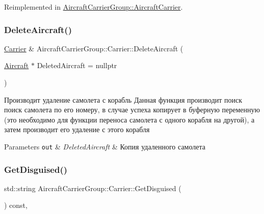 Reimplemented in \mbox{\hyperlink{class_aircraft_carrier_group_1_1_aircraft_carrier_ab2caba5f25f136dff2354539b47ff68c}{Aircraft\+Carrier\+Group\+::\+Aircraft\+Carrier}}.

\mbox{\label{class_aircraft_carrier_group_1_1_carrier_a23f5d495e4bb570a8abb7ee08cce2d12}} 
\subsubsection{\texorpdfstring{Delete\+Aircraft()}{DeleteAircraft()}}
{\footnotesize\ttfamily \mbox{\hyperlink{class_aircraft_carrier_group_1_1_carrier}{Carrier}} \& Aircraft\+Carrier\+Group\+::\+Carrier\+::\+Delete\+Aircraft (\begin{DoxyParamCaption}\item[{\mbox{\hyperlink{class_aircraft_carrier_group_1_1_aircraft}{Aircraft}} $\ast$}]{Deleted\+Aircraft = {\ttfamily nullptr} }\end{DoxyParamCaption})}



Производит удаление самолета с корабль  Данная функция производит поиск поиск самолета по его номеру, в случае успеха копирует в буферную переменную (это необходимо для функции переноса самолета с одного корабля на другой), а затем производит его удаление с этого корабля 


\begin{DoxyParams}[1]{Parameters}
\mbox{\tt out}  & {\em Deleted\+Aircraft} & Копия удаленного самолета \\
\hline
\end{DoxyParams}
\mbox{\label{class_aircraft_carrier_group_1_1_carrier_a5540afe1e3ed0c42d299d3a6dd230585}} 
\subsubsection{\texorpdfstring{Get\+Disguised()}{GetDisguised()}}
{\footnotesize\ttfamily std\+::string Aircraft\+Carrier\+Group\+::\+Carrier\+::\+Get\+Disguised (\begin{DoxyParamCaption}{ }\end{DoxyParamCaption}) const\hspace{0.3cm}{\ttfamily [inline]}, {\ttfamily [virtual]}}



